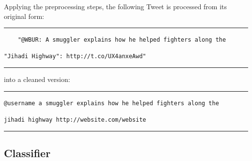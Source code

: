 Applying the preprocessing steps, the following Tweet is processed from its original form:
\medskip \hrule \medskip
\begin{verbatim}
	"@WBUR: A smuggler explains how he helped fighters along the \end{verbatim}\begin{verbatim}"Jihadi Highway": http://t.co/UX4anxeAwd"
\end{verbatim}
\medskip \hrule \medskip
into a cleaned version:
\medskip \hrule \medskip
\begin{verbatim}
@username a smuggler explains how he helped fighters along the \end{verbatim}\begin{verbatim}jihadi highway http://website.com/website
\end{verbatim}
\medskip \hrule \medskip



\subsection{Classifier}

